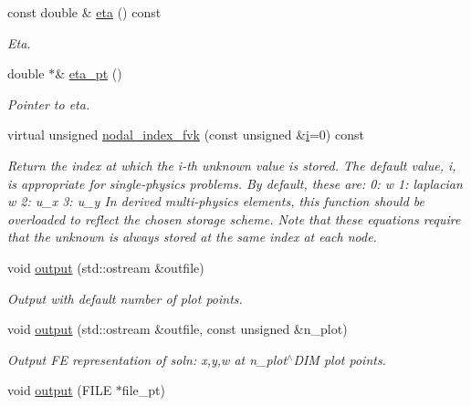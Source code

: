 \begin{DoxyCompactItemize}
const double \& \hyperlink{classoomph_1_1DisplacementBasedFoepplvonKarmanEquations_ad8e7978589f1ddf2de86510969288f57}{eta} () const
\begin{DoxyCompactList}\small\item\em Eta. \end{DoxyCompactList}\item 
double $\ast$\& \hyperlink{classoomph_1_1DisplacementBasedFoepplvonKarmanEquations_ab1d473f22df694550ded35e1879db49e}{eta\+\_\+pt} ()
\begin{DoxyCompactList}\small\item\em Pointer to eta. \end{DoxyCompactList}\item 
virtual unsigned \hyperlink{classoomph_1_1DisplacementBasedFoepplvonKarmanEquations_a85e8c68577eb3c8528269db180d8db84}{nodal\+\_\+index\+\_\+fvk} (const unsigned \&\hyperlink{cfortran_8h_adb50e893b86b3e55e751a42eab3cba82}{i}=0) const
\begin{DoxyCompactList}\small\item\em Return the index at which the i-\/th unknown value is stored. The default value, i, is appropriate for single-\/physics problems. By default, these are\+: 0\+: w 1\+: laplacian w 2\+: u\+\_\+x 3\+: u\+\_\+y In derived multi-\/physics elements, this function should be overloaded to reflect the chosen storage scheme. Note that these equations require that the unknown is always stored at the same index at each node. \end{DoxyCompactList}\item 
void \hyperlink{classoomph_1_1DisplacementBasedFoepplvonKarmanEquations_a7e806927a451e21dc0b2f10cf98a5941}{output} (std\+::ostream \&outfile)
\begin{DoxyCompactList}\small\item\em Output with default number of plot points. \end{DoxyCompactList}\item 
void \hyperlink{classoomph_1_1DisplacementBasedFoepplvonKarmanEquations_a675597ddd788e92dd6fb8d3bfed01c5b}{output} (std\+::ostream \&outfile, const unsigned \&n\+\_\+plot)
\begin{DoxyCompactList}\small\item\em Output FE representation of soln\+: x,y,w at n\+\_\+plot$^\wedge$\+D\+IM plot points. \end{DoxyCompactList}\item 
void \hyperlink{classoomph_1_1DisplacementBasedFoepplvonKarmanEquations_ac969427e1333e212f74e5d2833d1c1b7}{output} (F\+I\+LE $\ast$file\+\_\+pt)

\end{DoxyCompactItemize}
